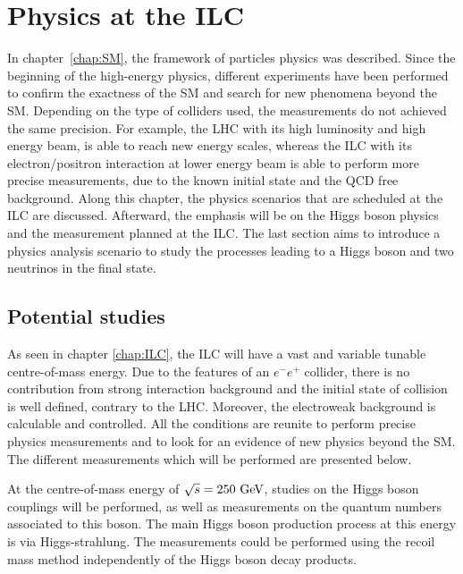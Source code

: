 \chapter{Physics at the ILC}
\label{chap:phyics}

  In chapter~\ref{chap:SM}, the framework of particles physics was described. 
  Since the beginning of the high-energy physics, different experiments have been performed to confirm the exactness of the \acrfull{SM} and search for new phenomena beyond the \gls{SM}.
  Depending on the type of colliders used, the measurements do not achieved the same precision. 
  For example, the \gls{LHC} with its high luminosity and high energy beam, is able to reach new energy scales, whereas the \gls{ILC} with its electron/positron interaction at lower energy beam is able to perform more precise measurements, due to the known initial state and the \gls{QCD} free background. 
  Along this chapter, the physics scenarios that are scheduled at the \gls{ILC} are discussed. 
  Afterward, the emphasis will be on the Higgs boson physics and the measurement planned at the \gls{ILC}. 
  The last section aims to introduce a physics analysis scenario to study the processes leading to a Higgs boson and two neutrinos in the final state.
 
 \minitoc

  \section{Potential studies}

  As seen in chapter \ref{chap:ILC}, the \gls{ILC} will have a vast and variable tunable centre-of-mass energy.
  Due to the features of an $e^-e^+$ collider, there is no contribution from strong interaction background and the initial state of collision is well defined, contrary to the \gls{LHC}.
  Moreover, the electroweak background is calculable and controlled.
  All the conditions are reunite to perform precise physics measurements and to look for an evidence of new physics beyond the \gls{SM}.
  The different measurements which will be performed are presented below.

  At the centre-of-mass energy of $\sqrt{s} = 250~\rm{GeV}$, studies on the Higgs boson couplings will be performed, as well as measurements on the quantum numbers associated to this boson.
  The main Higgs boson production process at this energy is via Higgs-strahlung.
  The measurements could be performed using the recoil mass method independently of the Higgs boson decay products.
 
